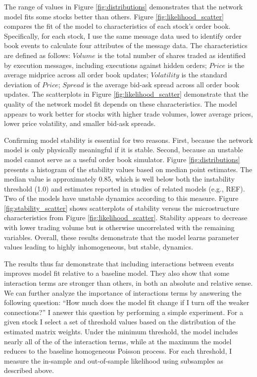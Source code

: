 The range of values in Figure \ref{fig:distributions} demonstrates that the network model fits some stocks better than others. Figure \ref{fig:likelihood_scatter} compares the fit of the model to characteristics of each stock’s order book. Specifically, for each stock, I use the same message data used to identify order book events to calculate four attributes of the message data. The characteristics are defined as follows: $Volume$ is the total number of shares traded as identified by execution messages, including executions against hidden orders; $Price$ is the average midprice across all order book updates; $Volatility$ is the standard deviation of $Price$; $Spread$ is the average bid-ask spread across all order book updates. The scatterplots in Figure \ref{fig:likelihood_scatter} demonstrate that the quality of the network model fit depends on these characteristics. The model appears to work better for stocks with higher trade volumes, lower average prices, lower price volatility, and smaller bid-ask spreads.

Confirming model stability is essential for two reasons. First, because the network model is only physically meaningful if it is stable. Second, because an unstable model cannot serve as a useful order book simulator. Figure \ref{fig:distributions} presents a histogram of the stability values based on median point estimates. The median value is approximately 0.85, which is well below both the instability threshold (1.0) and estimates reported in studies of related models (e.g., REF). Two of the models have unstable dynamics according to this measure. Figure \ref{fig:stability_scatter} shows scatterplots of stability versus the microstructure characteristics from Figure \ref{fig:likelihood_scatter}. Stability appears to decrease with lower trading volume but is otherwise uncorrelated with the remaining variables. Overall, these results demonstrate that the model learns parameter values leading to highly inhomogeneous, but stable, dynamics.

The results thus far demonstrate that including interactions between events improves model fit relative to a baseline model. They also show that some interaction terms are stronger than others, in both an absolute and relative sense. We can further analyze the importance of interactions terms by answering the following question: “How much does the model fit change if I turn off the weaker connections?” I answer this question by performing a simple experiment. For a given stock I select a set of threshold values based on the distribution of the estimated matrix weights. Under the minimum threshold, the model includes nearly all of the of the interaction terms, while at the maximum the model reduces to the baseline homogeneous Poisson process. For each threshold, I measure the in-sample and out-of-sample likelihood using subsamples as described above.

